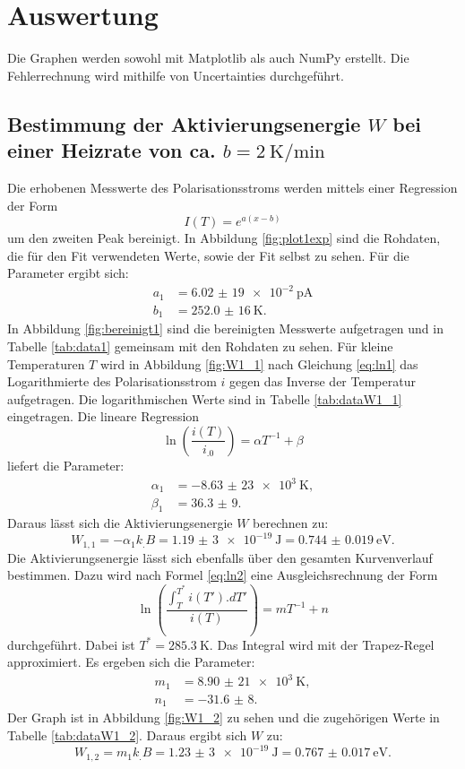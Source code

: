 \section{Auswertung}
\label{sec:Auswertung}

Die Graphen werden sowohl mit Matplotlib \cite{matplotlib} als auch NumPy \cite{numpy} erstellt. Die Fehlerrechnung wird mithilfe von Uncertainties \cite{uncertainties} durchgeführt.

\subsection{Bestimmung der Aktivierungsenergie $W$ bei einer Heizrate von ca. $b=\SI{2}{\kelvin\per\minute}$}

Die erhobenen Messwerte des Polarisationsstroms werden mittels einer Regression der Form
\begin{equation}
I(T)=e^{a(x-b)} \label{eq:reg1}
\end{equation}
um den zweiten Peak bereinigt. In Abbildung \ref{fig:plot1exp} sind die Rohdaten, die für den Fit verwendeten Werte, sowie der Fit selbst zu sehen.
Für die Parameter ergibt sich:
\begin{align*}
a_1&=\SI{6,02(19)e-2}{\pico\ampere}\\
b_1&=\SI{252,0(16)}{\kelvin}\text{.}
\end{align*}
In Abbildung \ref{fig:bereinigt1} sind die bereinigten Messwerte aufgetragen und in Tabelle \ref{tab:data1} gemeinsam mit den Rohdaten zu sehen.
Für kleine Temperaturen $T$ wird in Abbildung \ref{fig:W1_1} nach Gleichung \eqref{eq:ln1} das Logarithmierte des Polarisationsstrom $i$ gegen das Inverse der Temperatur aufgetragen. Die logarithmischen Werte sind in Tabelle \ref{tab:dataW1_1} eingetragen.
Die lineare Regression
\begin{equation}
\ln\left(\frac{i(T)}{i_.0}\right)=\alpha T^{-1}+\beta \label{eq:reg2}
\end{equation}
liefert die Parameter:
\begin{align*}
\alpha_1&=\SI{-8,63(23)e3}{\kelvin},\\
\beta_1 &= \num{36,3(9)}\text{.}
\end{align*}
Daraus lässt sich die Aktivierungsenergie $W$ berechnen zu:
\[
W_{1,1} = -\alpha_1 k_.B =\SI{1,19(3)e-19}{\joule}=\SI{0.744(19)}{\electronvolt}\text{.}
\]
Die Aktivierungsenergie lässt sich ebenfalls über den gesamten Kurvenverlauf bestimmen. Dazu wird nach Formel \eqref{eq:ln2} eine Ausgleichsrechnung der Form 
\begin{equation}
\ln\left(\frac{\int_T^{T^*} i(T').dT'}{i(T)}\right) = mT^{-1}+n \label{eq:reg3}
\end{equation}
durchgeführt. Dabei ist $T^*=\SI{285,3}{\kelvin}$. Das Integral wird mit der Trapez-Regel approximiert. Es ergeben sich die Parameter:
\begin{align*}
m_1&=\SI{8,90(21)e3}{\kelvin},\\
n_1&=\num{-31,6(8)}\text{.}
\end{align*}
Der Graph ist in Abbildung \ref{fig:W1_2} zu sehen und die zugehörigen Werte in Tabelle \ref{tab:dataW1_2}.
Daraus ergibt sich $W$ zu:
\[
W_{1,2} = m_1 k_.B =\SI{1,23(3)e-19}{\joule}=\SI{0.767(17)}{\electronvolt}\text{.}
\]

